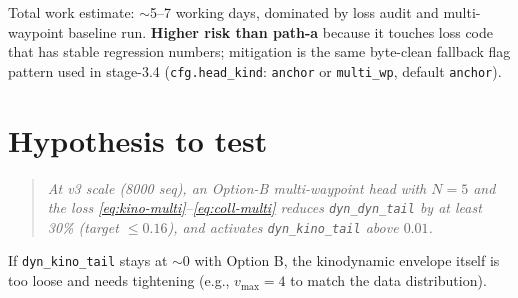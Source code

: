 \documentclass[11pt]{article}
\begin{document}
Total work estimate: $\sim$5--7 working days, dominated by loss audit and
multi-waypoint baseline run. \textbf{Higher risk than path-a} because it touches
loss code that has stable regression numbers; mitigation is the same byte-clean
fallback flag pattern used in stage-3.4 (\texttt{cfg.head\_kind}: \texttt{anchor}
or \texttt{multi\_wp}, default \texttt{anchor}).

\section{Hypothesis to test}

\begin{quote}
  \emph{At v3 scale (8000 seq), an Option-B multi-waypoint head with $N=5$ and
  the loss \eqref{eq:kino-multi}--\eqref{eq:coll-multi} reduces
  \texttt{dyn\_dyn\_tail} by at least 30\% (target $\le 0.16$), and activates
  \texttt{dyn\_kino\_tail} above $0.01$.}
\end{quote}

If \texttt{dyn\_kino\_tail} stays at $\sim$0 with Option B, the kinodynamic
envelope itself is too loose and needs tightening (e.g., $v_{\max}=4$ to match
the data distribution).
\end{document}
